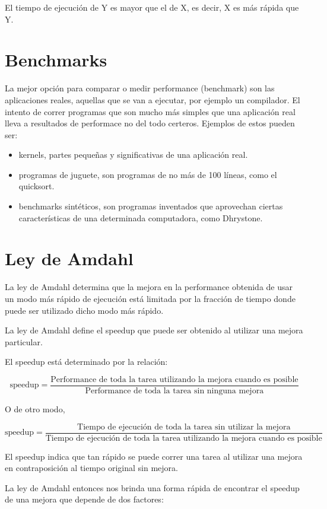 El tiempo de ejecución de Y es mayor que el de X, es decir, X es más rápida que Y.

\section{Benchmarks}
La mejor opción para comparar o medir performance (benchmark) son las aplicaciones reales, aquellas que se van a ejecutar, por ejemplo un compilador. El intento de correr programas que son mucho más simples que una aplicación real lleva a resultados de performace no del todo certeros. Ejemplos de estos pueden ser:

\begin{itemize}
\item kernels, partes pequeñas y significativas de una aplicación real.
\item programas de juguete, son programas de no más de 100 líneas, como el quicksort.
\item benchmarks sintéticos, son programas inventados que aprovechan ciertas características de una determinada computadora, como Dhrystone.
\end{itemize}

\section{Ley de Amdahl}
La ley de Amdahl determina que la mejora en la performance obtenida de usar un modo más rápido de ejecución está limitada por la fracción de tiempo donde puede ser utilizado dicho modo más rápido.

La ley de Amdahl define el speedup que puede ser obtenido al utilizar una mejora particular. 

El speedup está determinado por la relación:

\[\text{speedup} = \frac{\text{Performance de toda la tarea utilizando la mejora cuando es posible}}{\text{Performance de toda la tarea sin ninguna mejora}} \]

O de otro modo,

\[\text{speedup} = \frac{\text{Tiempo de ejecución de toda la tarea sin utilizar la mejora}}{\text{Tiempo de ejecución de toda la tarea utilizando la mejora cuando es posible}} \]

El speedup indica que tan rápido se puede correr una tarea al utilizar una mejora en contraposición al tiempo original sin mejora.

La ley de Amdahl entonces nos brinda una forma rápida de encontrar el speedup de una mejora que depende de dos factores:

